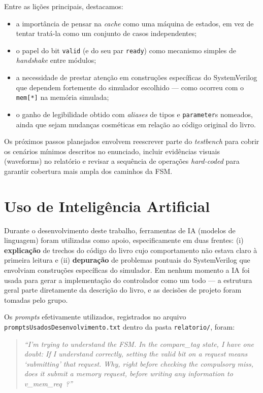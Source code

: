 \documentclass[12pt]{article}
\begin{document}
Entre as lições principais, destacamos:

\begin{itemize}
    \item a importância de pensar na \emph{cache} como uma máquina
    de estados, em vez de tentar tratá-la como um conjunto de
    casos independentes;
    \item o papel do bit \texttt{valid} (e do seu par
    \texttt{ready}) como mecanismo simples de \emph{handshake}
    entre módulos;
    \item a necessidade de prestar atenção em construções
    específicas do SystemVerilog que dependem fortemente do
    simulador escolhido --- como ocorreu com o
    \texttt{mem[*]} na memória simulada;
    \item o ganho de legibilidade obtido com \emph{aliases} de
    tipos e \texttt{parameter}s nomeados, ainda que sejam
    mudanças cosméticas em relação ao código original do livro.
\end{itemize}

Os próximos passos planejados envolvem reescrever parte do
\emph{testbench} para cobrir os cenários mínimos descritos no
enunciado, incluir evidências visuais (waveforms) no relatório e
revisar a sequência de operações \emph{hard-coded} para garantir
cobertura mais ampla dos caminhos da FSM.

\section{Uso de Inteligência Artificial}

Durante o desenvolvimento deste trabalho, ferramentas de IA
(modelos de linguagem) foram utilizadas como apoio,
especificamente em duas frentes: (i) \textbf{explicação} de
trechos do código do livro cujo comportamento não estava claro à
primeira leitura e (ii) \textbf{depuração} de problemas pontuais
do SystemVerilog que envolviam construções específicas do
simulador. Em nenhum momento a IA foi usada para gerar a
implementação do controlador como um todo --- a estrutura geral
parte diretamente da descrição do livro, e as decisões de projeto
foram tomadas pelo grupo.

Os \emph{prompts} efetivamente utilizados, registrados no arquivo
\texttt{promptsUsadosDesenvolvimento.txt} dentro da pasta
\texttt{relatorio/}, foram:

\begin{quote}
\emph{``I'm trying to understand the FSM. In the compare\_tag
state, I have one doubt: If I understand correctly, setting the
valid bit on a request means `submitting' that request. Why, right
before checking the compulsory miss, does it submit a memory
request, before writing any information to v\_mem\_req~?''}
\end{quote}
\end{document}

